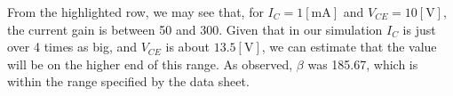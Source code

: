 \begin{enumerate}
\begin{enumerate}
        From the highlighted row, we may see that, for $I_C=1[\si{\milli\ampere}]$ and $V_{CE}=10[\si{\volt}]$, the current gain is between 50 and 300. Given that in our simulation $I_C$ is just over 4 times as big, and $V_{CE}$ is about $13.5[\si{\volt}]$, we can estimate that the value will be on the higher end of this range. As observed, $\beta$ was 185.67, which is within the range specified by the data sheet.

    \end{enumerate}

\end{enumerate}



